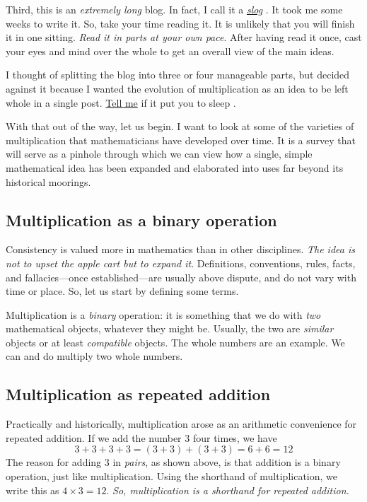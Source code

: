 \documentclass[
  a4paper,
]{article}
\begin{document}
Third, this is an \emph{extremely long} blog. In fact, I call it a
\href{https://www.vocabulary.com/dictionary/slog}{\emph{slog}}
 \normalfont. It took me some weeks to write it. So, take
your time reading it. It is unlikely that you will finish it in one
sitting. \emph{Read it in parts at your own pace}. After having read it
once, cast your eyes and mind over the whole to get an overall view of
the main ideas.

I thought of splitting the blog into three or four manageable parts, but
decided against it because I wanted the evolution of multiplication as
an idea to be left whole in a single post.
\href{mailto:feedback.swanlotus@gmail.com}{Tell me} if it put you to
sleep  \normalfont.

With that out of the way, let us begin. I want to look at some of the
varieties of multiplication that mathematicians have developed over
time. It is a survey that will serve as a pinhole through which we can
view how a single, simple mathematical idea has been expanded and
elaborated into uses far beyond its historical moorings.

\hypertarget{multiplication-as-a-binary-operation}{%
\subsection{Multiplication as a binary
operation}\label{multiplication-as-a-binary-operation}}

Consistency is valued more in mathematics than in other disciplines.
\emph{The idea is not to upset the apple cart but to expand it}.
Definitions, conventions, rules, facts, and fallacies---once
established---are usually above dispute, and do not vary with time or
place. So, let us start by defining some terms.

Multiplication is a \emph{binary} operation: it is something that we do
with \emph{two} mathematical objects, whatever they might be. Usually,
the two are \emph{similar} objects or at least \emph{compatible}
objects. The whole numbers are an example. We can and do multiply two
whole numbers.

\hypertarget{multiplication-as-repeated-addition}{%
\subsection{Multiplication as repeated
addition}\label{multiplication-as-repeated-addition}}

Practically and historically, multiplication arose as an arithmetic
convenience for repeated addition. If we add the number \(3\) four
times, we have \[
3 + 3 + 3 + 3 = (3 + 3) + (3 + 3) = 6 + 6 = 12
\] The reason for adding \(3\) in \emph{pairs}, as shown above, is that
addition is a binary operation, just like multiplication. Using the
shorthand of multiplication, we write this as \(4 \times 3 = 12\).
\emph{So, multiplication is a shorthand for repeated addition.}
\end{document}
